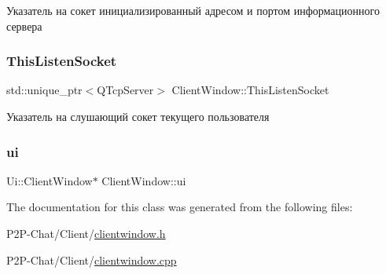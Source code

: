Указатель на сокет инициализированный адресом и портом информационного сервера 

\mbox{\label{class_client_window_acff726e7e30b6bb9fd190181fbea4835}} 
\subsubsection{\texorpdfstring{This\+Listen\+Socket}{ThisListenSocket}}
{\footnotesize\ttfamily std\+::unique\+\_\+ptr$<$Q\+Tcp\+Server$>$ Client\+Window\+::\+This\+Listen\+Socket\hspace{0.3cm}{\ttfamily [private]}}



Указатель на слушающий сокет текущего пользователя 

\mbox{\label{class_client_window_a1fbbfac70cc4e23f0d44ac209804bfc9}} 
\subsubsection{\texorpdfstring{ui}{ui}}
{\footnotesize\ttfamily Ui\+::\+Client\+Window$\ast$ Client\+Window\+::ui\hspace{0.3cm}{\ttfamily [private]}}



The documentation for this class was generated from the following files\+:\begin{DoxyCompactItemize}
\item 
P2\+P-\/\+Chat/\+Client/\hyperlink{clientwindow_8h}{clientwindow.\+h}\item 
P2\+P-\/\+Chat/\+Client/\hyperlink{clientwindow_8cpp}{clientwindow.\+cpp}\end{DoxyCompactItemize}
